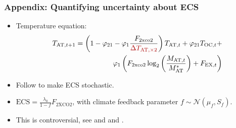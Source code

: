 \documentclass[10pt,aspectratio=169]{beamer}
\newcommand{\stoch}[1]{\textcolor{darkred}{#1}}
\begin{document}
\begin{frame}
\frametitle{Appendix: Quantifying uncertainty about ECS}
\small
\begin{itemize}
\item Temperature equation:
\begin{align}
T_{\mathrm{AT},t+1} = \left(1-\varphi_{21} - \varphi_1\frac{F_{\mathrm{2xco2}}}{\stoch{\Delta T_{\mathrm{AT},\times 2}}}\right)T_{\mathrm{AT},t}+\varphi_{21}T_{\mathrm{OC},t}+\\
\varphi_1 \left(F_{\mathrm{2xco2}} \log_2 \left(\frac{M_{\mathrm{AT},t}}{M_{\mathrm{AT}}^\ast} \right)+F_{\mathrm{EX},t} \right)
\end{align}
    \item Follow \cite{roe2007climate} to make ECS stochastic.
    \item $\mathrm{ECS}=\frac{\lambda_0}{1-f} F_{\mathrm{2XCO2}}$, with climate feedback parameter $ f \sim  \mathcal{N}\left(\mu_{f}, S_f \right) $.
\item  This is controversial, see \cite{zaliapin2010another} and \cite{roe2011comment} and \cite{zaliapin2011reply}.
\end{itemize}
\end{frame}
\end{document}
